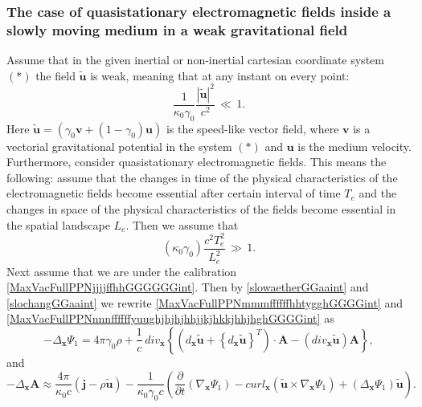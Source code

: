 \documentclass{article}
\theoremstyle{definition}
\theoremstyle{remark}
\renewcommand{\vec}[1]{\mathbf{#1}}
\newcommand{\er}{\eqref}
\newcommand{\er}{\eqref}
\begin{document}
\subsubsection{The case of quasistationary electromagnetic fields
inside a slowly moving medium in a weak gravitational
field}
Assume that in the given inertial or non-inertial
cartesian coordinate system $(*)$ the field $\vec {\tilde u}$ is
weak, meaning that at any instant on every point:
\begin{equation}\label{slowaetherGGaaint}
\frac{1}{\kappa_0\gamma_0}\frac{|\vec {\tilde u}|^2}{c^2}\,\ll\, 1.
\end{equation}
Here $\vec {\tilde u}=\left(\gamma_0\vec v+(1-\gamma_0)\vec
u\right)$ is the speed-like vector field, where $\vec v$ is a
vectorial gravitational potential in the system $(*)$ and $\vec u$
is the medium velocity. Furthermore, consider quasistationary
electromagnetic fields. This means the following: assume that the
changes in time of the physical characteristics of the
electromagnetic fields become essential after certain interval of
time $T_e$ and the changes in space of the physical characteristics
of the fields become essential in the spatial landscape $L_e$. Then
we assume that
\begin{equation}\label{slochangGGaaint}
(\kappa_0\gamma_0)\frac{c^2T^2_e}{L^2_e}\,\gg\, 1.
\end{equation}
Next assume that we are under the calibration
\er{MaxVacFullPPNjjjjffhhGGGGGGint}. Then by \er{slowaetherGGaaint}
and \er{slochangGGaaint} we rewrite
\er{MaxVacFullPPNmmmffffffhhtygghGGGGint} and
\er{MaxVacFullPPNnnnffffffyuughjhjhjhhjjkjhkkjhhjhghGGGGint} as
\begin{equation}\label{MaxVacFullPPNmmmffffffhhtygghGGGGaaint}
-\Delta_{\vec x}\Psi_1=4\pi\gamma_0\rho+\frac{1}{c}\,div_{\vec x}
\left\{\left(d_{\vec x}\vec {\tilde u}+\left\{d_{\vec x}\vec {\tilde
u}\right\}^T\right)\cdot\vec A-\left(div_{\vec x}\vec {\tilde
u}\right)\vec A\right\},
\end{equation}
and
\begin{equation}\label{MaxVacFullPPNnnnffffffyuughjhjhjhhjjkjhkkjhhjhghGGGGaa1int}
-\Delta_{\vec x}\vec A\approx \frac{4\pi}{\kappa_0 c}\left(\vec
j-\rho\vec {\tilde u}\right)-\frac{1}{\kappa_0\gamma_0
c}\left(\frac{\partial}{\partial t}\left(\nabla_{\vec
x}\Psi_1\right)-curl_{\vec x}\left(\vec {\tilde u}\times\nabla_{\vec
x}\Psi_1\right)+\left(\Delta_{\vec x}\Psi_1\right)\vec {\tilde
u}\right).
%
%
%
\end{equation}
\end{document}
